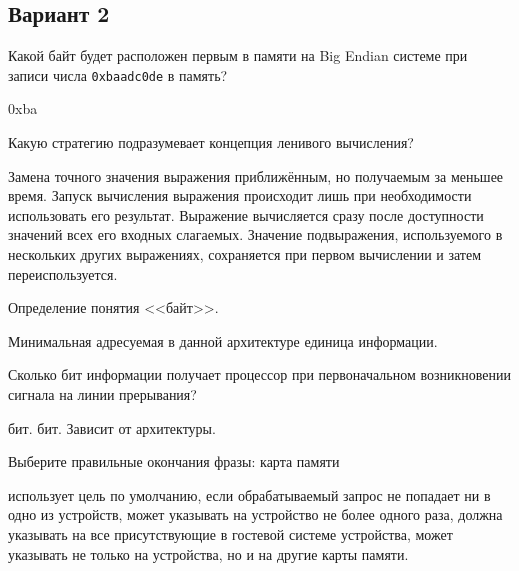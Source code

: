 \subsection*{Вариант 2}

\begin{questions}

\question[3] Какой байт будет расположен первым в памяти на Big Endian системе при записи числа \texttt{0xbaadc0de} в память?
\begin{solution}[1cm]
0xba
\end{solution}


\question[3] Какую стратегию подразумевает концепция ленивого вычисления?
\begin{choices}
	\choice Замена точного значения выражения приближённым, но получаемым за меньшее время.
	\correctchoice Запуск вычисления выражения происходит лишь при необходимости использовать его результат.
	\choice Выражение вычисляется сразу после доступности значений всех его входных слагаемых.
	\choice Значение подвыражения, используемого в нескольких других выражениях, сохраняется при первом вычислении и затем переиспользуется.
\end{choices}

\question[3] Определение понятия <<байт>>.
\begin{solution}[1cm]
Минимальная адресуемая в данной архитектуре единица информации.
\end{solution}

\question[3] Сколько бит информации получает процессор при первоначальном возникновении сигнала на линии прерывания?
\begin{choices}
	 бит.
	 бит.
	\choice Зависит от архитектуры.
\end{choices}

\question[3] Выберите правильные окончания фразы: карта памяти
\begin{choices}
	\correctchoice использует цель по умолчанию, если обрабатываемый запрос не попадает ни в одно из устройств,
	\choice может указывать на устройство не более одного раза,
	\choice должна указывать на все присутствующие в гостевой системе устройства,
	\correctchoice может указывать не только на устройства, но и на другие карты памяти.
\end{choices}


\end{questions}

